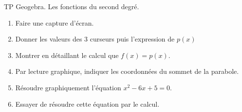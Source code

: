{\begin{activity}{TP Geogebra. Les fonctions du second degré.}
\begin{enumerate}[resume]
\item Faire une capture d'écran.

\item Donner les valeurs des 3 curseurs puis l'expression de $p(x)$

\item Montrer en détaillant le calcul que  $f(x)=p(x)$. 

\item Par lecture graphique, indiquer les coordonnées du sommet de la parabole.

\item Résoudre graphiquement l'équation $x^2-6x+5=0$.

\item Essayer de résoudre cette équation par le calcul.

\end{enumerate}

\end{activity}

}